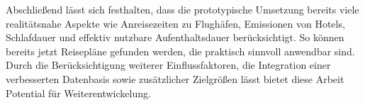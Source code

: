 Abschließend lässt sich festhalten, dass die prototypische Umsetzung bereits viele realitätsnahe Aspekte wie Anreisezeiten zu Flughäfen, Emissionen von Hotels, Schlafdauer und effektiv nutzbare Aufenthaltsdauer berücksichtigt. So können bereits jetzt Reisepläne gefunden werden, die praktisch sinnvoll anwendbar sind. Durch die Berücksichtigung weiterer Einflussfaktoren, die Integration einer verbesserten Datenbasis sowie zusätzlicher Zielgrößen lässt bietet diese Arbeit Potential für Weiterentwickelung.
